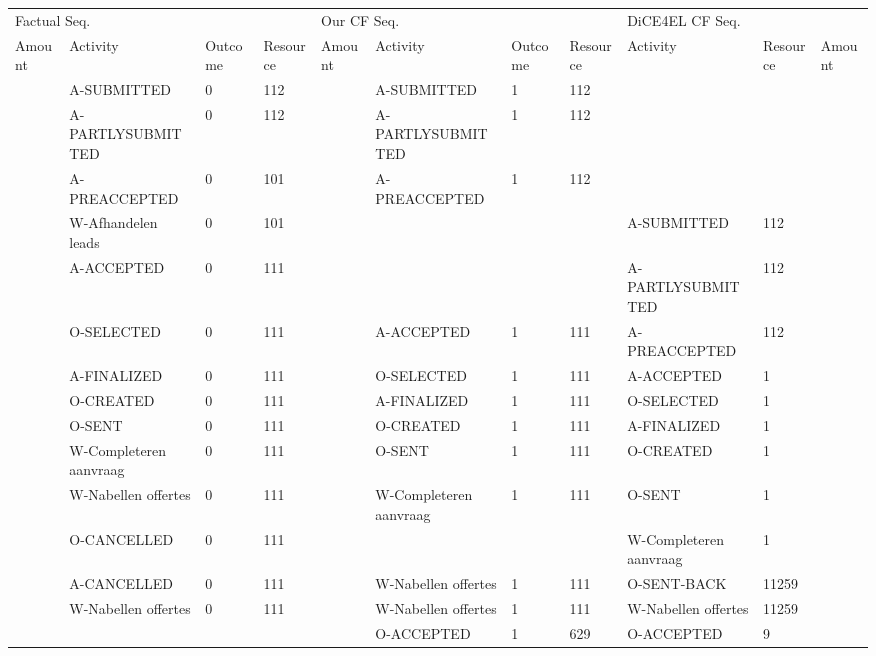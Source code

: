 \begin{tabular}{lllllllllll}
\toprule
\multicolumn{4}{l}{Factual Seq.} & \multicolumn{4}{l}{Our CF Seq.} & \multicolumn{3}{l}{DiCE4EL CF Seq.} \\
Amount & Activity & Outcome & Resource & Amount & Activity & Outcome & Resource & Activity & Resource & Amount \\
\midrule
 & A-SUBMITTED & 0 & 112 &  & A-SUBMITTED & 1 & 112 &  &  &  \\
 & A-PARTLYSUBMITTED & 0 & 112 &  & A-PARTLYSUBMITTED & 1 & 112 &  &  &  \\
 & A-PREACCEPTED & 0 & 101 &  & A-PREACCEPTED & 1 & 112 &  &  &  \\
 & W-Afhandelen leads & 0 & 101 &  &  &  &  & A-SUBMITTED & 112 &  \\
 & A-ACCEPTED & 0 & 111 &  &  &  &  & A-PARTLYSUBMITTED & 112 &  \\
 & O-SELECTED & 0 & 111 &  & A-ACCEPTED & 1 & 111 & A-PREACCEPTED & 112 &  \\
 & A-FINALIZED & 0 & 111 &  & O-SELECTED & 1 & 111 & A-ACCEPTED & 1 &  \\
 & O-CREATED & 0 & 111 &  & A-FINALIZED & 1 & 111 & O-SELECTED & 1 &  \\
 & O-SENT & 0 & 111 &  & O-CREATED & 1 & 111 & A-FINALIZED & 1 &  \\
 & W-Completeren aanvraag & 0 & 111 &  & O-SENT & 1 & 111 & O-CREATED & 1 &  \\
 & W-Nabellen offertes & 0 & 111 &  & W-Completeren aanvraag & 1 & 111 & O-SENT & 1 &  \\
 & O-CANCELLED & 0 & 111 &  &  &  &  & W-Completeren aanvraag & 1 &  \\
 & A-CANCELLED & 0 & 111 &  & W-Nabellen offertes & 1 & 111 & O-SENT-BACK & 11259 &  \\
 & W-Nabellen offertes & 0 & 111 &  & W-Nabellen offertes & 1 & 111 & W-Nabellen offertes & 11259 &  \\
 &  &  &  &  & O-ACCEPTED & 1 & 629 & O-ACCEPTED & 9 &  \\
\bottomrule
\end{tabular}
